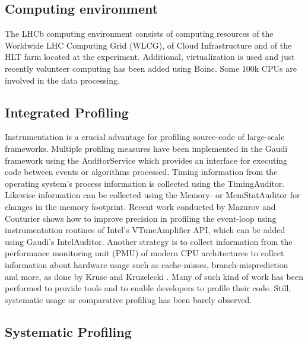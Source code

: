 \documentclass[a4paper]{jpconf}
\begin{document}
\subsection{Computing environment}
\label{sec:computing_environment}

The LHCb computing environment consists of computing resources of the Worldwide LHC Computing Grid (WLCG), of Cloud Infrastructure and of the HLT farm located at the experiment. Additional, virtualization is used and just recently volunteer computing has been added using Boinc. Some 100k CPUs are involved in the data processing. 

\subsection{Integrated Profiling}
\label{sec:integrated_profiling}

Instrumentation is a crucial advantage for profiling source-code of large-scale frameworks. Multiple profiling measures have been implemented in the Gaudi framework using the AuditorService \cite{status_gaudi} which provides an interface for executing code between events or algorithms processed.
\newline
Timing information from the operating system's process information is collected using the TimingAuditor. Likewise information can be collected using the Memory- or MemStatAuditor for changes in the memory footprint. Recent work \cite{intel_auditor} conducted by Mazurov and Couturier shows how to improve precision in profiling the event-loop using instrumentation routines of Intel's VTune\texttrademark Amplifier API, which can be added using Gaudi's IntelAuditor. Another strategy is to collect information from the performance monitoring unit (PMU) of modern CPU architectures to collect information about hardware usage such as cache-misses, branch-misprediction and more, as done by Kruse and Kruzelecki \cite{modular_monitoring}. Many of such kind of work has been performed to provide tools and to enable developers to profile their code. Still, systematic usage or comparative profiling has been barely observed.

\subsection{Systematic Profiling}
\label{sec:integrated_profiling}
\end{document}
